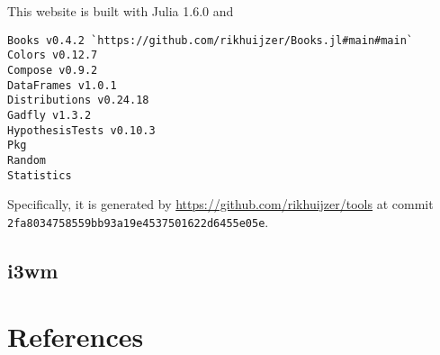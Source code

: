 \documentclass[
  14pt
  american,
  paper=a4,
  ,captions=tableheading
]{scrbook}
\newcommand{\passthrough}[1]{#1}
\begin{document}
This website is built with Julia 1.6.0 and

\begin{lstlisting}
Books v0.4.2 `https://github.com/rikhuijzer/Books.jl#main#main`
Colors v0.12.7
Compose v0.9.2
DataFrames v1.0.1
Distributions v0.24.18
Gadfly v1.3.2
HypothesisTests v0.10.3
Pkg
Random
Statistics
\end{lstlisting}

Specifically, it is generated by
\url{https://github.com/rikhuijzer/tools} at commit
\passthrough{\lstinline!2fa8034758559bb93a19e4537501622d6455e05e!}.

\hypertarget{i3wm}{%
\section{i3wm}\label{i3wm}}

\hypertarget{references}{%
\chapter*{References}\label{references}}
\end{document}
